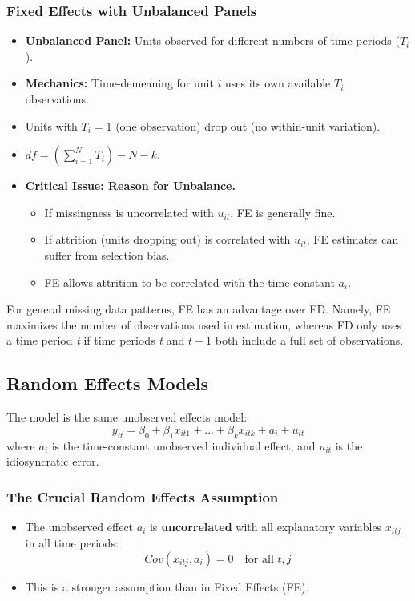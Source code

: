 \documentclass[a4paper, 10pt]{article}
\theoremstyle{definition}	%
\begin{document}
\subsubsection{Fixed Effects with Unbalanced Panels}
\begin{itemize}
    \item \textbf{Unbalanced Panel:} Units observed for different numbers of time periods (\(T_i\)).
    \item \textbf{Mechanics:} Time-demeaning for unit \(i\) uses its own available \(T_i\) observations.
    \item Units with \(T_i=1\) (one observation) drop out (no within-unit variation).
    \item \(df = (\sum_{i=1}^{N} T_i) - N - k\).
    \item \textbf{Critical Issue: Reason for Unbalance.}
    \begin{itemize}
        \item If missingness is uncorrelated with \(u_{it}\), FE is generally fine.
        \item If attrition (units dropping out) is correlated with \(u_{it}\), FE estimates can suffer from selection bias.
        \item FE allows attrition to be correlated with the time-constant \(a_i\).
    \end{itemize}
\end{itemize}
For general missing data patterns, FE has an advantage over FD. Namely, FE maximizes the number of observations used in estimation, whereas FD only uses a time period \textit{t} if time periods \textit{t} and $t - 1$ both include a full set of observations.

\subsection{Random Effects Models}

The model is the same unobserved effects model:
\begin{equation} \label{eq:re_model_original}
y_{it} = \beta_0 + \beta_1 x_{it1} + \dots + \beta_k x_{itk} + a_i + u_{it}
\end{equation}
where \(a_i\) is the time-constant unobserved individual effect, and \(u_{it}\) is the idiosyncratic error.

\subsubsection{The Crucial Random Effects Assumption}
\begin{itemize}
    \item The unobserved effect \(a_i\) is \textbf{uncorrelated} with all explanatory variables \(x_{itj}\) in all time periods:
    \[ Cov(x_{itj}, a_i) = 0 \quad \text{for all } t, j \]
    \item This is a stronger assumption than in Fixed Effects (FE).
\end{itemize}
\end{document}
